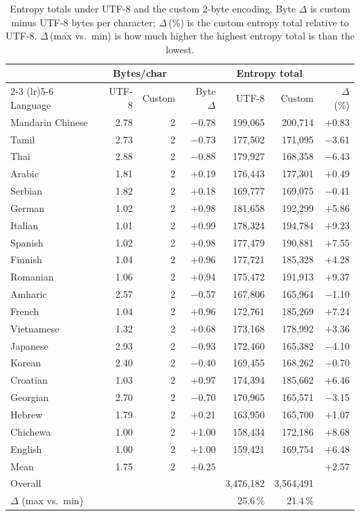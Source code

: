 \begin{table}[ht]
\centering
\small
\setlength{\tabcolsep}{5pt}
\begin{tabular}{lrrrrrr}
\toprule
 & \multicolumn{2}{c}{Bytes/char} & & \multicolumn{2}{c}{Entropy total} & \\
\cmidrule(lr){2-3} \cmidrule(lr){5-6}
Language & UTF-8 & Custom & Byte $\Delta$ & UTF-8 & Custom & $\Delta$ (\%) \\
\midrule
Mandarin Chinese & 2.78 & 2 & $-$0.78 & 199{,}065 & 200{,}714 & $+$0.83 \\
Tamil & 2.73 & 2 & $-$0.73 & 177{,}502 & 171{,}095 & $-$3.61 \\
Thai & 2.88 & 2 & $-$0.88 & 179{,}927 & 168{,}358 & $-$6.43 \\
Arabic & 1.81 & 2 & $+$0.19 & 176{,}443 & 177{,}301 & $+$0.49 \\
Serbian & 1.82 & 2 & $+$0.18 & 169{,}777 & 169{,}075 & $-$0.41 \\
German & 1.02 & 2 & $+$0.98 & 181{,}658 & 192{,}299 & $+$5.86 \\
Italian & 1.01 & 2 & $+$0.99 & 178{,}324 & 194{,}784 & $+$9.23 \\
Spanish & 1.02 & 2 & $+$0.98 & 177{,}479 & 190{,}881 & $+$7.55 \\
Finnish & 1.04 & 2 & $+$0.96 & 177{,}721 & 185{,}328 & $+$4.28 \\
Romanian & 1.06 & 2 & $+$0.94 & 175{,}472 & 191{,}913 & $+$9.37 \\
Amharic & 2.57 & 2 & $-$0.57 & 167{,}806 & 165{,}964 & $-$1.10 \\
French & 1.04 & 2 & $+$0.96 & 172{,}761 & 185{,}269 & $+$7.24 \\
Vietnamese & 1.32 & 2 & $+$0.68 & 173{,}168 & 178{,}992 & $+$3.36 \\
Japanese & 2.93 & 2 & $-$0.93 & 172{,}460 & 165{,}382 & $-$4.10 \\
Korean & 2.40 & 2 & $-$0.40 & 169{,}455 & 168{,}262 & $-$0.70 \\
Croatian & 1.03 & 2 & $+$0.97 & 174{,}394 & 185{,}662 & $+$6.46 \\
Georgian & 2.70 & 2 & $-$0.70 & 170{,}965 & 165{,}571 & $-$3.15 \\
Hebrew & 1.79 & 2 & $+$0.21 & 163{,}950 & 165{,}700 & $+$1.07 \\
Chichewa & 1.00 & 2 & $+$1.00 & 158{,}434 & 172{,}186 & $+$8.68 \\
English & 1.00 & 2 & $+$1.00 & 159{,}421 & 169{,}754 & $+$6.48 \\
\midrule
Mean & 1.75 & 2 & $+$0.25 & & & $+$2.57 \\
Overall & & & & 3{,}476{,}182 & 3{,}564{,}491 & \\
$\Delta$ (max vs.\ min) & & & & 25.6\,\% & 21.4\,\% & \\
\bottomrule
\end{tabular}
\caption{Entropy totals under UTF-8 and the custom 2-byte encoding. Byte $\Delta$ is custom minus UTF-8 bytes per character; $\Delta$\,(\%) is the custom entropy total relative to UTF-8. $\Delta$\,(max vs.\ min) is how much higher the highest entropy total is than the lowest.}
\label{tab:entropy-delta}
\end{table}
